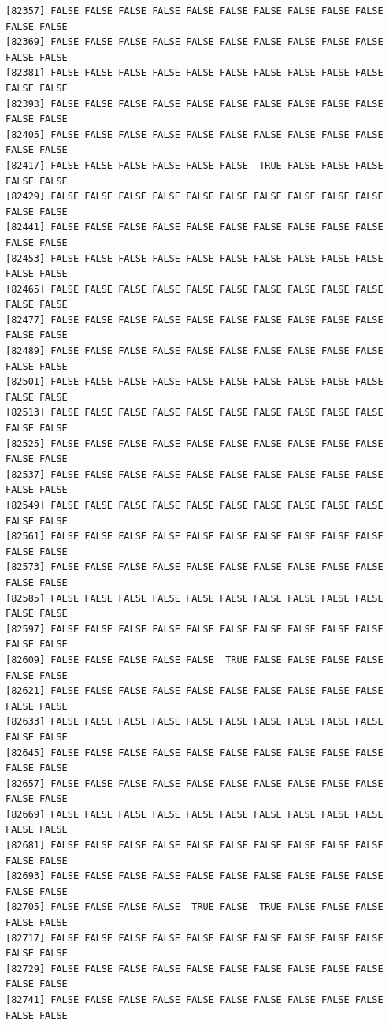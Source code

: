 \documentclass[
  a4paper,
  DIV=11,
  numbers=noendperiod]{scrartcl}
\begin{document}
\begin{verbatim}
[82357] FALSE FALSE FALSE FALSE FALSE FALSE FALSE FALSE FALSE FALSE FALSE FALSE
[82369] FALSE FALSE FALSE FALSE FALSE FALSE FALSE FALSE FALSE FALSE FALSE FALSE
[82381] FALSE FALSE FALSE FALSE FALSE FALSE FALSE FALSE FALSE FALSE FALSE FALSE
[82393] FALSE FALSE FALSE FALSE FALSE FALSE FALSE FALSE FALSE FALSE FALSE FALSE
[82405] FALSE FALSE FALSE FALSE FALSE FALSE FALSE FALSE FALSE FALSE FALSE FALSE
[82417] FALSE FALSE FALSE FALSE FALSE FALSE  TRUE FALSE FALSE FALSE FALSE FALSE
[82429] FALSE FALSE FALSE FALSE FALSE FALSE FALSE FALSE FALSE FALSE FALSE FALSE
[82441] FALSE FALSE FALSE FALSE FALSE FALSE FALSE FALSE FALSE FALSE FALSE FALSE
[82453] FALSE FALSE FALSE FALSE FALSE FALSE FALSE FALSE FALSE FALSE FALSE FALSE
[82465] FALSE FALSE FALSE FALSE FALSE FALSE FALSE FALSE FALSE FALSE FALSE FALSE
[82477] FALSE FALSE FALSE FALSE FALSE FALSE FALSE FALSE FALSE FALSE FALSE FALSE
[82489] FALSE FALSE FALSE FALSE FALSE FALSE FALSE FALSE FALSE FALSE FALSE FALSE
[82501] FALSE FALSE FALSE FALSE FALSE FALSE FALSE FALSE FALSE FALSE FALSE FALSE
[82513] FALSE FALSE FALSE FALSE FALSE FALSE FALSE FALSE FALSE FALSE FALSE FALSE
[82525] FALSE FALSE FALSE FALSE FALSE FALSE FALSE FALSE FALSE FALSE FALSE FALSE
[82537] FALSE FALSE FALSE FALSE FALSE FALSE FALSE FALSE FALSE FALSE FALSE FALSE
[82549] FALSE FALSE FALSE FALSE FALSE FALSE FALSE FALSE FALSE FALSE FALSE FALSE
[82561] FALSE FALSE FALSE FALSE FALSE FALSE FALSE FALSE FALSE FALSE FALSE FALSE
[82573] FALSE FALSE FALSE FALSE FALSE FALSE FALSE FALSE FALSE FALSE FALSE FALSE
[82585] FALSE FALSE FALSE FALSE FALSE FALSE FALSE FALSE FALSE FALSE FALSE FALSE
[82597] FALSE FALSE FALSE FALSE FALSE FALSE FALSE FALSE FALSE FALSE FALSE FALSE
[82609] FALSE FALSE FALSE FALSE FALSE  TRUE FALSE FALSE FALSE FALSE FALSE FALSE
[82621] FALSE FALSE FALSE FALSE FALSE FALSE FALSE FALSE FALSE FALSE FALSE FALSE
[82633] FALSE FALSE FALSE FALSE FALSE FALSE FALSE FALSE FALSE FALSE FALSE FALSE
[82645] FALSE FALSE FALSE FALSE FALSE FALSE FALSE FALSE FALSE FALSE FALSE FALSE
[82657] FALSE FALSE FALSE FALSE FALSE FALSE FALSE FALSE FALSE FALSE FALSE FALSE
[82669] FALSE FALSE FALSE FALSE FALSE FALSE FALSE FALSE FALSE FALSE FALSE FALSE
[82681] FALSE FALSE FALSE FALSE FALSE FALSE FALSE FALSE FALSE FALSE FALSE FALSE
[82693] FALSE FALSE FALSE FALSE FALSE FALSE FALSE FALSE FALSE FALSE FALSE FALSE
[82705] FALSE FALSE FALSE FALSE  TRUE FALSE  TRUE FALSE FALSE FALSE FALSE FALSE
[82717] FALSE FALSE FALSE FALSE FALSE FALSE FALSE FALSE FALSE FALSE FALSE FALSE
[82729] FALSE FALSE FALSE FALSE FALSE FALSE FALSE FALSE FALSE FALSE FALSE FALSE
[82741] FALSE FALSE FALSE FALSE FALSE FALSE FALSE FALSE FALSE FALSE FALSE FALSE

\end{verbatim}
\end{document}
